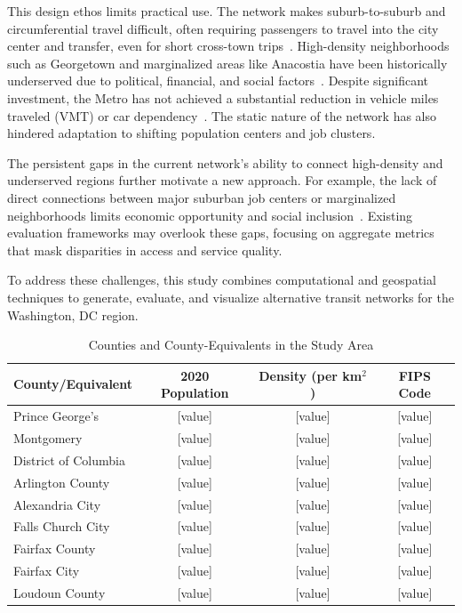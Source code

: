 \documentclass[manuscript]{acmart}
\begin{document}
This design ethos limits practical use. The network makes suburb-to-suburb and circumferential travel difficult, often requiring passengers to travel into the city center and transfer, even for short cross-town trips~\cite{lit:wmata_stats}. High-density neighborhoods such as Georgetown and marginalized areas like Anacostia have been historically underserved due to political, financial, and social factors~\cite{lit:equity}. Despite significant investment, the Metro has not achieved a substantial reduction in vehicle miles traveled (VMT) or car dependency~\cite{lit:env}. The static nature of the network has also hindered adaptation to shifting population centers and job clusters.

The persistent gaps in the current network's ability to connect high-density and underserved regions further motivate a new approach. For example, the lack of direct connections between major suburban job centers or marginalized neighborhoods limits economic opportunity and social inclusion~\cite{lit:equity}. Existing evaluation frameworks may overlook these gaps, focusing on aggregate metrics that mask disparities in access and service quality. 

To address these challenges, this study combines computational and geospatial techniques to generate, evaluate, and visualize alternative transit networks for the Washington, DC region. 



\begin{table}[h]
\caption{Counties and County-Equivalents in the Study Area}
\label{tab:counties}
\begin{tabular}{lccc}
\toprule
County/Equivalent & 2020 Population & Density (per km$^2$) & FIPS Code \\
\midrule
Prince George's & [value] & [value] & [value] \\
Montgomery & [value] & [value] & [value] \\
District of Columbia & [value] & [value] & [value] \\
Arlington County & [value] & [value] & [value] \\
Alexandria City & [value] & [value] & [value] \\
Falls Church City & [value] & [value] & [value] \\
Fairfax County & [value] & [value] & [value] \\
Fairfax City & [value] & [value] & [value] \\
Loudoun County & [value] & [value] & [value] \\
\bottomrule
\end{tabular}
\end{table}
\end{document}
